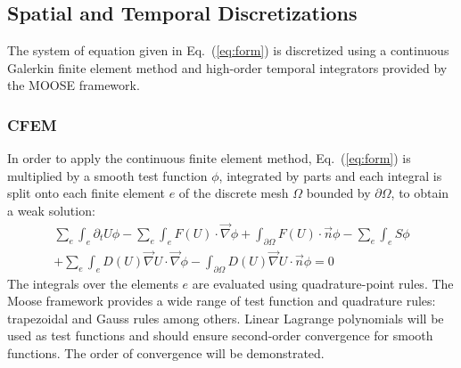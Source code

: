 \documentclass[preprint,10pt]{elsarticle}
\newcommand{\grad}{\vec{\nabla}}
\newcommand{\eqt}[1]{Eq.~(\ref{#1})}                     %
\begin{document}
\subsection{Spatial and Temporal Discretizations} \label{sec:disc}
The system of equation given in \eqt{eq:form} is discretized using a continuous Galerkin finite element method and high-order temporal integrators provided by the MOOSE framework.
\subsubsection{CFEM} 
In order to apply the continuous finite element method, \eqt{eq:form} is multiplied by a smooth test function $\phi$, integrated by parts and each integral is split onto each finite element $e$ of the discrete mesh $\Omega$ bounded by $\partial \Omega$, to obtain a weak solution:
\begin{eqnarray}\label{eq:cfem}
\sum_e \int_{e} \partial_t U \phi - \sum_e \int_{e} F(U) \cdot \grad \phi + \int_{\partial \Omega} F(U) \cdot \vec{n} \phi - \sum_e \int_{e} S \phi \nonumber \\
+ \sum_e \int_{e} D(U) \grad U \cdot \grad \phi - \int_{\partial \Omega} D(U) \grad U \cdot \vec{n} \phi= 0
\end{eqnarray}
The integrals over the elements $e$ are evaluated using quadrature-point rules. The Moose framework provides a wide range of test function and quadrature rules: trapezoidal and Gauss rules among others. Linear Lagrange polynomials will be used as test functions and should ensure second-order convergence for smooth functions. The order of convergence will be demonstrated.
\end{document}
